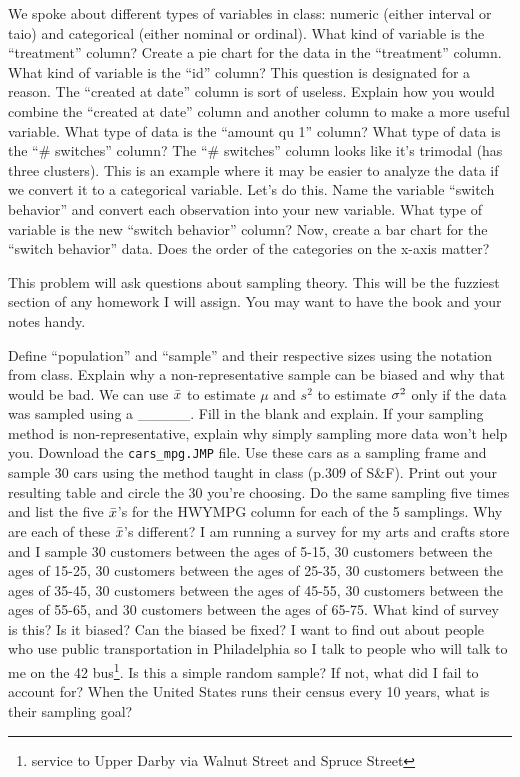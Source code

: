 \documentclass[12pt]{article}
\begin{document}
\benum
\easysubproblem We spoke about different types of variables in class: numeric (either interval or taio) and categorical (either nominal or ordinal). What kind of variable is the ``treatment'' column?
\easysubproblem Create a pie chart for the data in the ``treatment'' column.
\intermediatesubproblem What kind of variable is the ``id'' column? This question is designated  for a reason.
\intermediatesubproblem The ``created at date'' column is sort of useless. Explain how you would combine the ``created at date'' column and another column to make a more useful variable.
\easysubproblem What type of data is the ``amount qu 1'' column?
\easysubproblem What type of data is the ``\# switches'' column?
\intermediatesubproblem The ``\# switches'' column looks like it's trimodal (\ie has three clusters). This is an example where it may be easier to analyze the data if we convert it to a categorical variable. Let's do this. Name the variable ``switch behavior'' and convert each observation into your new variable.
\easysubproblem What type of variable is the new ``switch behavior'' column?
\intermediatesubproblem Now, create a bar chart for the ``switch behavior'' data. Does the order of the categories on the x-axis matter?
\eenum

\problem This problem will ask questions about sampling theory. This will be the fuzziest section of any homework I will assign. You may want to have the book and your notes handy.

\benum
\easysubproblem Define ``population'' and ``sample'' and their respective sizes using the notation from class.
\intermediatesubproblem Explain why a non-representative sample can be biased and why that would be bad.
\easysubproblem We can use $\bar{x}$ to estimate $\mu$ and $s^2$ to estimate $\sigma^2$ only if the data was sampled using a \_\_\_\_\_. Fill in the blank and explain.
\easysubproblem If your sampling method is non-representative, explain why simply sampling more data won't help you.
\intermediatesubproblem Download the \texttt{cars\_mpg.JMP} file. Use these cars as a sampling frame and sample 30 cars using the method taught in class (p.309 of S\&F). Print out your resulting table and circle the 30 you're choosing.
\intermediatesubproblem Do the same sampling five times and list the five $\bar{x}$'s for the HWYMPG column for each of the 5 samplings. Why are each of these $\bar{x}$'s different?
\easysubproblem I am running a survey for my arts and crafts store and I sample 30 customers between the ages of 5-15, 30 customers between the ages of 15-25, 30 customers between the ages of 25-35, 30 customers between the ages of 35-45, 30 customers between the ages of 45-55, 30 customers between the ages of 55-65, and 30 customers between the ages of 65-75. What kind of survey is this? Is it biased? Can the biased be fixed?
\intermediatesubproblem I want to find out about people who use public transportation in Philadelphia so I talk to  people who will talk to me on the 42 bus\footnote{service to Upper Darby via Walnut Street and Spruce Street}. Is this a simple random sample? If not, what did I fail to account for?
\easysubproblem When the United States runs their census every 10 years, what is their sampling goal?
\eenum
\end{document}
